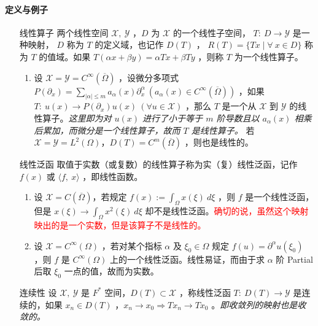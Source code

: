 \paragraph{定义与例子}
\begin{enumerate}[leftmargin=2cm, label=\arabic*]
    \item[线性算子]两个线性空间 $\mathscr{X},\ \mathscr{Y}$ ，$D$ 为 $\mathscr{X}$ 的一个线性子空间， $T:\ D\to\mathscr{Y}$ 是一种映射， $D$ 称为 $T$ 的定义域，也记作 $D(T)$ ， $R(T)=\{Tx\mid \forall\ x\in D\}$ 称为 $T$ 的值域。如果 $T(\alpha x + \beta y) = \alpha Tx + \beta Ty$ ，则称 $T$ 为一个线性算子。
    \begin{enumerate}[leftmargin=1cm, label=(\arabic*)]
        \item 设 $\mathscr{X} = \mathscr{Y} = C^{\infty}(\overline{\Omega})$ ，设微分多项式 $P(\partial_x) = \sum\limits_{|\alpha|\leqslant m} a_{\alpha}(x)\partial_x^{\alpha}\ (a_{\alpha}(x)\in C^{\infty}(\overline{\Omega}))$ ，如果 $T:\ u(x)\to P(\partial_x)u(x)\ (\forall u\in\mathscr{X})$ ，那么 $T$ 是一个从 $\mathscr{X}$ 到 $\mathscr{Y}$ 的线性算子。\textit{这里即为对 $u(x)$ 进行了小于等于 $m$ 阶导数且以 $a_{\alpha}(x)$ 相乘后累加，而微分是一个线性算子，故而 $T$ 是线性算子。} 若 $\mathscr{X} = \mathscr{Y} = L^2(\Omega)$，$D(T) = C^m(\overline{\Omega})$ ，则也是线性的。
    \end{enumerate}
    \item[线性泛函] 取值于实数（或复数）的线性算子称为实（复）线性泛函，记作 $f(x)$ 或 $\langle f,\ x\rangle$ ，即线性函数。
    \begin{enumerate}[leftmargin=1cm, label=(\arabic*)]
        \item 设 $\mathscr{X} =C(\overline{\Omega})$，若规定 $f(x) := \int_{\Omega} x(\xi)\ d\xi$ ，则 $f$ 是一个线性泛函，但是 $x(\xi)\to \int_{\Omega} x^2(\xi) \ d\xi$ 却不是线性泛函。\textcolor{red}{确切的说，虽然这个映射映出的是一个实数，但是该算子不是线性的。}
        \item 设 $\mathscr{X} = C^{\infty}(\Omega)$ ，若对某个指标 $\alpha$ 及 $\xi_0\in\Omega$ 规定 $f(u) = \partial^{\alpha} u(\xi_0)$ ，则 $f$ 是 $C^{\infty}(\Omega)$ 上的一个线性泛函。线性易证，而由于求 $\alpha$ 阶 Partial 后取 $\xi_0$ 一点的值，故而为实数。
    \end{enumerate}
    \item[连续性] 设 $\mathscr{X},\ \mathscr{Y}$ 是 $F^*$ 空间，$D(T)\subset \mathscr{X}$ ，称线性泛函 $T:\ D(T)\to\mathscr{Y}$ 是连续的，如果 $x_n\in D(T)$ ，$x_n\to x_0 \Longrightarrow Tx_n\to Tx_0$ 。\textit{即收敛列的映射也是收敛的。}

\end{enumerate}

